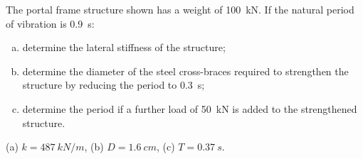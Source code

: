 
\begin{Exercise}[label={frames_modification}]
The portal frame structure shown has a weight of \SI{100}{kN}. If the natural period of vibration is \SI{0.9}{s}:
\begin{enumerate}[(a)]
    \item determine the lateral stiffness of the structure;
    \item determine the diameter of the steel cross-braces required to strengthen the structure by reducing the period to \SI{0.3}{s};
    \item determine the period if a further load of \SI{50}{kN} is added to the strengthened structure.
\end{enumerate}

\begin{center}
\end{center}

\shortAnswer (a) $k = \SI{487}{kN/m}$, (b) $D = \SI{1.6}{cm}$, (c) $T = \SI{0.37}{s}$.
\end{Exercise}




